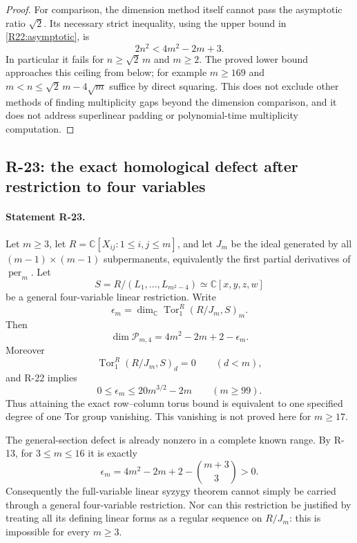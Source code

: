 \begin{proof}
For comparison, the dimension method itself cannot pass the
asymptotic ratio $\sqrt2$. Its necessary strict inequality, using
the upper bound in \eqref{R22:asymptotic}, is
\[
 2n^2<4m^2-2m+3.
\]
In particular it fails for $n\geq\sqrt2\,m$ and $m\geq2$.
The proved lower bound approaches this ceiling from below; for
example $m\geq169$ and
$m<n\leq\sqrt2\,m-4\sqrt m$ suffice by direct squaring.
This does not exclude other methods of finding multiplicity gaps
beyond the dimension comparison, and it does not address
superlinear padding or polynomial-time multiplicity computation.
\end{proof}
\subsection{R-23: the exact homological defect after restriction to four variables}

\paragraph{Statement R-23.}
Let $m\geq3$, let $R=\mathbb C[X_{ij}:1\leq i,j\leq m]$, and let
$J_m$ be the ideal generated by all $(m-1)\times(m-1)$
subpermanents, equivalently the first partial derivatives of
$\operatorname{per}_m$. Let
\[
 S=R/(L_1,\ldots,L_{m^2-4})\simeq\mathbb C[x,y,z,w]
\]
be a general four-variable linear restriction. Write
\[
 \epsilon_m=\dim_{\mathbb C}
       \operatorname{Tor}_1^R(R/J_m,S)_m.
\]
Then
\begin{equation}\label{R23:Tor_defect}
 \dim\mathcal P_{m,4}=4m^2-2m+2-\epsilon_m.
\end{equation}
Moreover
\begin{equation}\label{R23:first_degree}
 \operatorname{Tor}_1^R(R/J_m,S)_d=0\qquad(d<m),
\end{equation}
and R-22 implies
\[
 0\leq\epsilon_m\leq20m^{3/2}-2m\qquad(m\geq99).
\]
Thus attaining the exact row--column torus bound is equivalent to one
specified degree of one Tor group vanishing. This vanishing is not
proved here for $m\geq17$.

The general-section defect is already nonzero in a complete known
range. By R-13, for $3\leq m\leq16$ it is exactly
\begin{equation}\label{R23:small_defect}
 \epsilon_m=4m^2-2m+2-\binom{m+3}{3}>0.
\end{equation}
Consequently the full-variable linear syzygy theorem cannot simply be
carried through a general four-variable restriction. Nor can this
restriction be justified by treating all its defining linear forms as
a regular sequence on $R/J_m$: this is impossible for every $m\geq3$.

